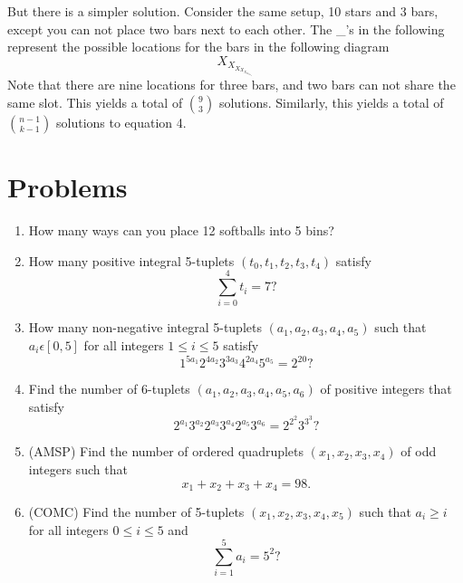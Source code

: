 \documentclass[11pt]{article}
\begin{document}
    But there is a simpler solution. Consider the same setup, 10 stars and 3 bars, except you can not place two bars next to each other. The _'s in the following represent the possible locations for the bars in the following diagram
    \begin{equation}
        X_X_X_X_X_X_X_X_X_X
    \end{equation}
    Note that there are nine locations for three bars, and two bars can not share the same slot. This yields a total of $\binom{9}{3}$ solutions. Similarly, this yields a total of $\binom{n-1}{k-1}$ solutions to equation 4.
    \section{Problems}
    \begin{enumerate}
        \item How many ways can you place 12 softballs into 5 bins?
        \item How many positive integral 5-tuplets $(t_0,t_1,t_2,t_3,t_4)$ satisfy $$\sum_{i=0}^4t_i=7?$$
        \item How many non-negative integral 5-tuplets $(a_1,a_2,a_3,a_4,a_5)$ such that $a_i\epsilon [0,5]$ for all integers $1\leq i\leq 5$ satisfy $$1^{5a_1}2^{4a_2}3^{3a_3}4^{2a_4}5^{a_5}=2^{20}?$$
        \item Find the number of 6-tuplets $(a_1,a_2,a_3,a_4,a_5,a_6)$ of positive integers that satisfy $$2^{a_1}3^{a_2}2^{a_3}3^{a_4}2^{a_5}3^{a_6}=2^{2^2}3^{3^3}?$$
        \item (AMSP) Find the number of ordered quadruplets $(x_1,x_2,x_3,x_4)$ of odd integers such that $$x_1+x_2+x_3+x_4=98.$$
        \item (COMC) Find the number of 5-tuplets $(x_1,x_2,x_3,x_4,x_5)$ such that $a_i\geq i$ for all integers $0\leq i\leq 5$ and $$\sum_{i=1}^5 a_i=5^2?$$
    \end{enumerate}
\end{document}
